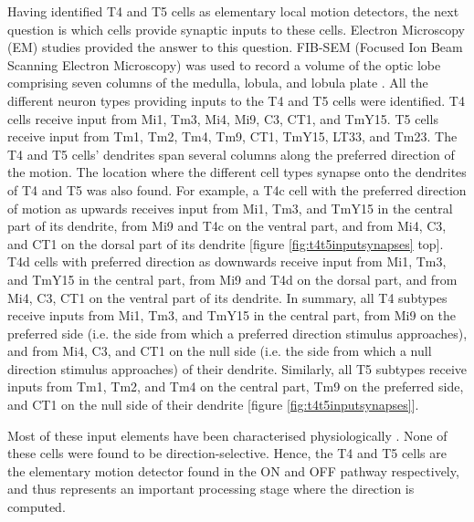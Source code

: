 Having identified T4 and T5 cells as elementary local motion detectors, the next question is which cells provide synaptic inputs to these cells. Electron Microscopy (EM) studies \parencite{Shinomiya2019, Takemura2017} provided the answer to this question. FIB-SEM (Focused Ion Beam Scanning Electron Microscopy) was used to record a volume of the optic lobe comprising seven columns of the medulla, lobula, and lobula plate \cite{Shinomiya2019}. All the different neuron types providing inputs to the T4 and T5 cells were identified. T4 cells receive input from Mi1, Tm3, Mi4, Mi9, C3, CT1, and TmY15. T5 cells receive input from Tm1, Tm2, Tm4, Tm9, CT1, TmY15, LT33, and Tm23. The T4 and T5 cells' dendrites span several columns along the preferred direction of the motion. The location where the different cell types synapse onto the dendrites of T4 and T5 was also found. For example, a T4c cell with the preferred direction of motion as upwards receives input from Mi1, Tm3, and TmY15 in the central part of its dendrite, from Mi9 and T4c on the ventral part, and from Mi4, C3, and CT1 on the dorsal part of its dendrite [figure \ref{fig:t4t5inputsynapses} top]. T4d cells with preferred direction as downwards receive input from Mi1, Tm3, and TmY15 in the central part, from Mi9 and T4d on the dorsal part, and from Mi4, C3, CT1 on the ventral part of its dendrite. In summary, all T4 subtypes receive inputs from Mi1, Tm3, and TmY15 in the central part, from Mi9 on the preferred side (i.e. the side from which a preferred direction stimulus approaches), and from Mi4, C3, and CT1 on the null side (i.e. the side from which a null direction stimulus approaches) of their dendrite. Similarly, all T5 subtypes receive inputs from Tm1, Tm2, and Tm4 on the central part, Tm9 on the preferred side, and CT1 on the null side of their dendrite [figure \ref{fig:t4t5inputsynapses}]. %

Most of these input elements have been characterised physiologically \parencite{Arenz2017, Serbe2016, Strother2017, Meier2019, Behnia2014, Groschner2022}. None of these cells were found to be direction-selective. Hence, the T4 and T5 cells are the elementary motion detector found in the ON and OFF pathway respectively, and thus represents an important processing stage where the direction is computed.    

